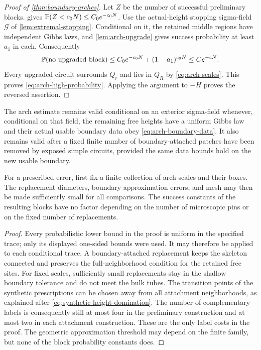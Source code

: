 \begin{proof}[Proof of \cref{thm:boundary-arches}]
Let $Z$ be the number of successful preliminary blocks.
 gives
$\mathbb P(Z<c_0N)\le C_0e^{-c_0N}$.  Use the actual-height stopping sigma-field
$\mathcal G$ of \cref{lem:extremal-stopping}.  Conditional on it, the retained
middle regions have independent Gibbs laws, and
\cref{lem:arch-upgrade} gives success probability at least $a_1$ in each.
Consequently
\[
 \mathbb P(\text{no upgraded block})
 \le C_0e^{-c_0N}+(1-a_1)^{c_0N}
 \le Ce^{-cN}.
\]
Every upgraded circuit surrounds $Q_r$ and lies in $Q_R$ by
\eqref{eq:arch-scales}.  This proves
\eqref{eq:arch-high-probability}.  Applying the argument to $-H$ proves the
reversed assertion.
\end{proof}

\begin{corollary}
\label{cor:boundary-robustness}
The arch estimate remains valid conditional on an exterior sigma-field
whenever, conditional on that field, the remaining free heights have a
uniform Gibbs law and their actual usable boundary data obey
\eqref{eq:arch-boundary-data}.  It also remains valid after a fixed finite
number of boundary-attached patches have been removed by exposed simple
circuits, provided the same data bounds hold on the new usable boundary.

For a prescribed error, first fix a finite collection of arch scales and
their boxes.  The replacement diameters, boundary approximation errors, and
mesh may then be made sufficiently small for all comparisons.  The success
constants of the resulting blocks have no factor depending on the number
of microscopic pins or on the fixed number of replacements.
\end{corollary}

\begin{proof}
Every probabilistic lower bound in the proof is uniform in the specified
trace; only its displayed one-sided bounds were used.  It may therefore be
applied to each conditional trace.  A boundary-attached replacement keeps
the skeleton connected and preserves the full-neighborhood condition for
the retained free sites.  For fixed scales, sufficiently small replacements
stay in the shallow boundary tolerance and do not meet the bulk tubes.
The transition points of the synthetic prescriptions can be chosen away
from all attachment neighborhoods, as explained after
\eqref{eq:synthetic-height-domination}.  The number of complementary labels
is consequently still at most four in the preliminary construction and at
most two in each attachment construction.  These are the only label costs
in the proof.  The geometric approximation threshold may depend on the
finite family, but none of the block probability constants does.
\end{proof}
